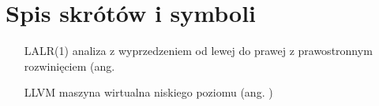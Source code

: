 \chapter{Spis skrótów i symboli}

\begin{itemize}
\item[LALR(1)] analiza z wyprzedzeniem od lewej do prawej z prawostronnym rozwinięciem (ang.
\item[LLVM] maszyna wirtualna niskiego poziomu (ang. )
\end{itemize}
